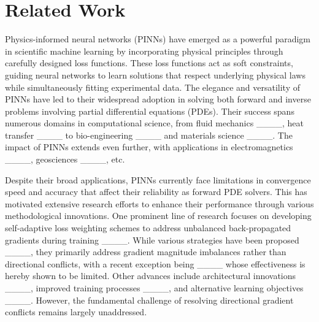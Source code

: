 \section{Related Work}
\label{sec: related_work}

Physics-informed neural networks (PINNs) have emerged as a powerful paradigm in scientific machine learning by incorporating physical principles through carefully designed loss functions. These loss functions act as soft constraints, guiding neural networks to learn solutions that respect underlying physical laws while simultaneously fitting experimental data. The elegance and versatility of PINNs have led to their widespread adoption in solving both forward and inverse problems involving partial differential equations (PDEs). Their success spans numerous domains in computational science, from fluid mechanics ____, heat transfer ____ to bio-engineering ____ and materials science ____. The impact of PINNs extends even further, with applications in electromagnetics ____, geosciences ____, etc.


Despite their broad applications, PINNs currently face limitations in convergence speed and accuracy that affect their reliability as forward PDE solvers. This has motivated extensive research efforts to enhance their performance through various methodological innovations.  One prominent line of research focuses on developing self-adaptive loss weighting schemes to address unbalanced back-propagated gradients during training ____. While various strategies have been proposed ____, they primarily address gradient magnitude imbalances rather than directional conflicts, with a recent exception being ____ whose effectiveness is hereby shown to be limited. Other advances include architectural innovations ____, improved training processes ____, and alternative learning objectives ____. However, the fundamental challenge of resolving directional gradient conflicts remains largely unaddressed.